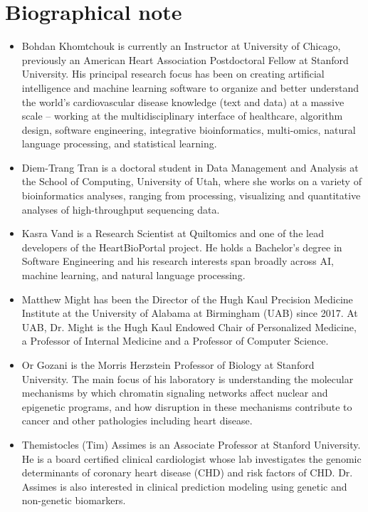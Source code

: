 \documentclass[11pt,letterpaper]{article}
\begin{document}
	\section*{Biographical note}
	\begin{itemize}
		\item Bohdan Khomtchouk is currently an Instructor at University of Chicago, previously an American Heart Association Postdoctoral Fellow at Stanford University. His principal research focus has been on creating artificial intelligence and machine learning software to organize and better understand the world's cardiovascular disease knowledge (text and data) at a massive scale -- working at the multidisciplinary interface of healthcare, algorithm design, software engineering, integrative bioinformatics, multi-omics, natural language processing, and statistical learning. 
		
		\item Diem-Trang Tran is a doctoral student in Data Management and Analysis at the School of Computing, University of Utah, where she works on a variety of bioinformatics analyses, ranging from processing, visualizing and quantitative analyses of high-throughput sequencing data.
		
		\item Kasra Vand is a Research Scientist at Quiltomics and one of the lead developers of the HeartBioPortal project.  He holds a Bachelor's degree in Software Engineering and his research interests span broadly across AI, machine learning, and natural language processing.
		
		\item Matthew Might has been the Director of the Hugh Kaul Precision Medicine Institute at the University of Alabama at Birmingham (UAB) since 2017.  At UAB, Dr. Might is the Hugh Kaul Endowed Chair of Personalized Medicine, a Professor of Internal Medicine and a Professor of Computer Science.
		
		\item Or Gozani is the Morris Herzstein Professor of Biology at Stanford University.  The main focus of his laboratory is understanding the molecular mechanisms by which chromatin signaling networks affect nuclear and epigenetic programs, and how disruption in these mechanisms contribute to cancer and other pathologies including heart disease.
		
		\item Themistocles (Tim) Assimes is an Associate Professor at Stanford University.  He is a board certified clinical cardiologist whose lab investigates the genomic determinants of coronary heart disease (CHD) and risk factors of CHD.  Dr. Assimes is also interested in clinical prediction modeling using genetic and non-genetic biomarkers.
	\end{itemize}
\end{document}
